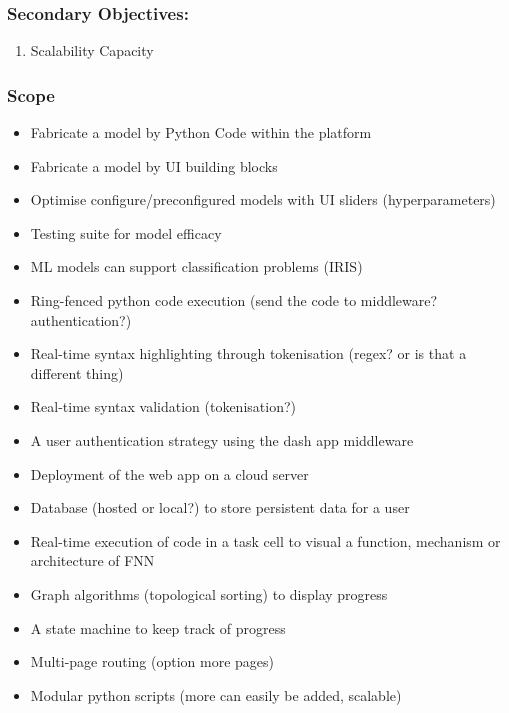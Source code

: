 \documentclass{article}
\begin{document}
\subsubsection{Secondary Objectives:} %
\begin{enumerate}
    \item Scalability Capacity %
\end{enumerate}
\subsubsection{Scope}
\begin{itemize}
    \item Fabricate a model by Python Code within the platform
    \item Fabricate a model by UI building blocks 
    \item Optimise configure/preconfigured models with UI sliders (hyperparameters)
    \item Testing suite for model efficacy
    \item ML models can support classification problems (IRIS)
    \item Ring-fenced python code execution (send the code to middleware? authentication?)
    \item Real-time syntax highlighting through tokenisation (regex? or is that a different thing)
    \item Real-time syntax validation (tokenisation?)
    \item A user authentication strategy using the dash app middleware
    \item Deployment of the web app on a cloud server %
    \item Database (hosted or local?) to store persistent data for a user
    \item Real-time execution of code in a task cell to visual a function, mechanism or architecture of FNN
    \item Graph algorithms (topological sorting) to display progress
    \item A state machine to keep track of progress
    \item Multi-page routing (option more pages)
    \item Modular python scripts (more can easily be added, scalable)

\end{itemize}
\end{document}
